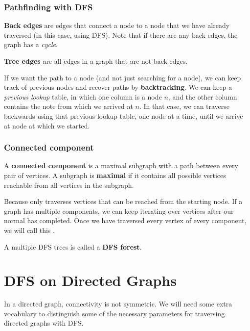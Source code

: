 \documentclass[titlepage, 12pt, leqno]{article}
\begin{document}
\subsubsection{Pathfinding with DFS}
\begin{definition}
    \textbf{Back edges} are edges that connect a node to a node that we have 
    already traversed (in this case, using DFS). Note that if there are any
    back edges, the graph has a \textit{cycle}.
\end{definition}

\begin{definition}
    \textbf{Tree edges} are all edges in a graph that are not back edges.
\end{definition}

If we want the path to a node (and not just searching for a node), we can keep
track of previous nodes and recover paths by \textbf{backtracking}. We can
keep a \textit{previous lookup} table, in which one column is a node $n$, and the
other column contains the note from which we arrived at $n$. In that case, we
can traverse backwards using that previous lookup table, one node at a time,
until we arrive at node at which we started.

\subsubsection{Connected component}
\begin{definition}
    A \textbf{connected component} is a maximal subgraph with a path between
    every pair of vertices. A subgraph is \textbf{maximal} if it contains all
    possible vertices reachable from all vertices in the subgraph.
\end{definition}

Because  only traverses vertices that can be reached from the
starting node. If a graph has multiple components, we can keep iterating over
vertices after our normal  has completed. Once we have traversed
every vertex of every component, we will call this .

\begin{definition}
    A multiple DFS trees is called a \textbf{DFS forest}.
\end{definition}

\pagebreak
\section{DFS on Directed Graphs}
In a directed graph, connectivity is not symmetric. We will need some extra
vocabulary to distinguish some of the necessary parameters for traversing
directed graphs with DFS.
\end{document}

